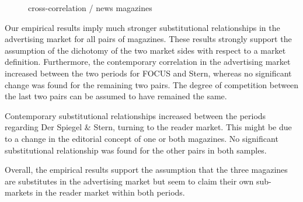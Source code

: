 \documentclass[12pt,a4paper,notitlepage]{article}
\begin{document}
\begin{figure}[H]\centering
\caption{cross-correlation / news magazines}
\label{fig_QQ_fss}
\end{figure}

Our empirical results imply much stronger substitutional relationships in the advertising market for all pairs of magazines. These results strongly support the assumption of the dichotomy of the two market sides with respect to a market definition. Furthermore, the contemporary correlation in the advertising market increased between the two periods for FOCUS and Stern, whereas no significant change was found for the remaining two pairs. The degree of competition between the last two pairs can be assumed to have remained the same. 

Contemporary substitutional relationships increased between the periods regarding Der Spiegel \& Stern, turning to the reader market. This might be due to a change in the editorial concept of one or both magazines. No significant substitutional relationship was found for the other pairs in both samples. 

Overall, the empirical results support the assumption that the three magazines are substitutes in the advertising market but seem to claim their own sub-markets in the reader market within both periods. 
\end{document}
